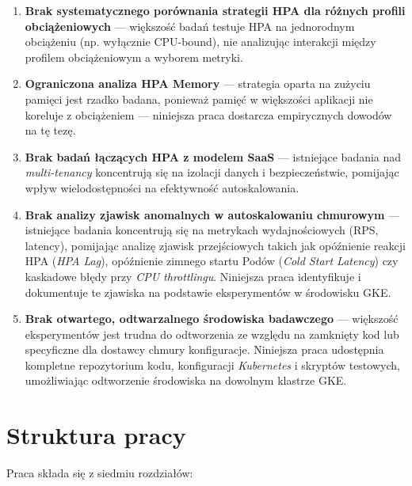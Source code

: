 \begin{enumerate}
  \item \textbf{Brak systematycznego porównania strategii HPA dla różnych profili obciążeniowych} — większość badań testuje HPA na jednorodnym obciążeniu (np. wyłącznie CPU-bound), nie analizując interakcji między profilem obciążeniowym a wyborem metryki.
  \item \textbf{Ograniczona analiza HPA Memory} — strategia oparta na zużyciu pamięci jest rzadko badana, ponieważ pamięć w większości aplikacji nie koreluje z obciążeniem — niniejsza praca dostarcza empirycznych dowodów na tę tezę.
  \item \textbf{Brak badań łączących HPA z modelem SaaS} — istniejące badania nad \textit{multi-tenancy} koncentrują się na izolacji danych i bezpieczeństwie, pomijając wpływ wielodostępności na efektywność autoskalowania.
  \item \textbf{Brak analizy zjawisk anomalnych w autoskalowaniu chmurowym} — istniejące badania koncentrują się na metrykach wydajnościowych (RPS, latency), pomijając analizę zjawisk przejściowych takich jak opóźnienie reakcji HPA (\textit{HPA Lag}), opóźnienie zimnego startu Podów (\textit{Cold Start Latency}) czy kaskadowe błędy przy \textit{CPU throttlingu}. Niniejsza praca identyfikuje i dokumentuje te zjawiska na podstawie eksperymentów w środowisku GKE.
  \item \textbf{Brak otwartego, odtwarzalnego środowiska badawczego} — większość eksperymentów jest trudna do odtworzenia ze względu na zamknięty kod lub specyficzne dla dostawcy chmury konfiguracje. Niniejsza praca udostępnia kompletne repozytorium kodu, konfiguracji \textit{Kubernetes} i skryptów testowych, umożliwiając odtworzenie środowiska na dowolnym klastrze GKE.
\end{enumerate}

\section{Struktura pracy}

Praca składa się z siedmiu rozdziałów:

